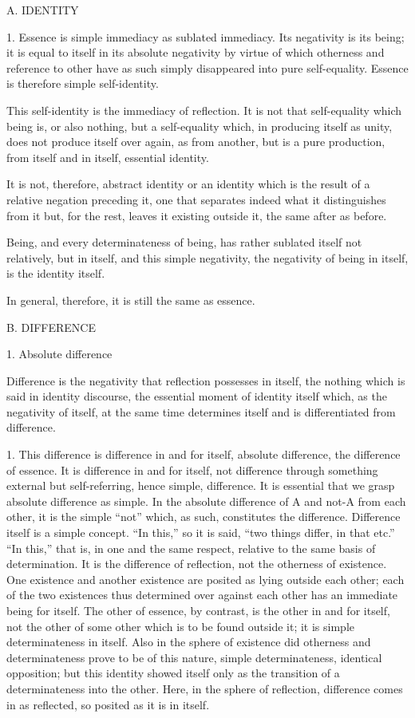 A. IDENTITY

1. Essence is simple immediacy as sublated immediacy.
Its negativity is its being;
it is equal to itself in its absolute negativity
by virtue of which otherness and reference to other
have as such simply disappeared into pure self-equality.
Essence is therefore simple self-identity.

This self-identity is the immediacy of reflection.
It is not that self-equality which being is, or also nothing,
but a self-equality which, in producing itself as unity,
does not produce itself over again, as from another,
but is a pure production, from itself and in itself,
essential identity.

It is not, therefore, abstract identity
or an identity which is the result of
a relative negation preceding it,
one that separates indeed
what it distinguishes from it
but, for the rest, leaves it existing outside it,
the same after as before.

Being, and every determinateness of being,
has rather sublated itself not relatively,
but in itself, and this simple negativity,
the negativity of being in itself,
is the identity itself.

In general, therefore, it is still the same as essence.

B. DIFFERENCE

1. Absolute difference

Difference is the negativity that reflection possesses in itself,
the nothing which is said in identity discourse,
the essential moment of identity itself which,
as the negativity of itself, at the same time determines itself
and is differentiated from difference.

1. This difference is difference in and for itself,
absolute difference, the difference of essence.
It is difference in and for itself,
not difference through something external
but self-referring, hence simple, difference.
It is essential that we grasp absolute difference as simple.
In the absolute difference of A and not-A from each other,
it is the simple “not” which, as such, constitutes the difference.
Difference itself is a simple concept.
“In this,” so it is said, “two things differ, in that etc.”
“In this,” that is, in one and the same respect,
relative to the same basis of determination.
It is the difference of reflection, not the otherness of existence.
One existence and another existence are posited as lying outside each other;
each of the two existences thus determined over against each other
has an immediate being for itself.
The other of essence, by contrast, is the other in and for itself,
not the other of some other which is to be found outside it;
it is simple determinateness in itself.
Also in the sphere of existence did otherness and determinateness
prove to be of this nature, simple determinateness, identical opposition;
but this identity showed itself only as
the transition of a determinateness into the other.
Here, in the sphere of reflection, difference comes in
as reflected, so posited as it is in itself.

